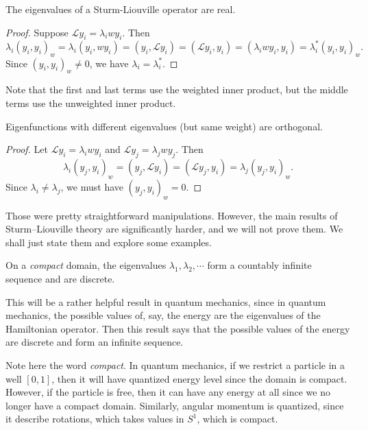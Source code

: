 \documentclass[a4paper]{article}
\begin{document}
\begin{prop}
  The eigenvalues of a Sturm-Liouville operator are real.
\end{prop}

\begin{proof}
  Suppose $\mathcal{L} y_i = \lambda_i w y_i$. Then
  \[
    \lambda_i (y_i, y_i)_w = \lambda_i (y_i, w y_i) = (y_i, \mathcal{L} y_i) = (\mathcal{L} y_i, y_i) = (\lambda_i w y_i, y_i) = \lambda_i^* (y_i, y_i)_w.
  \]
  Since $(y_i, y_i)_w \not= 0$, we have $\lambda_i = \lambda_i^*$.
\end{proof}
Note that the first and last terms use the weighted inner product, but the middle terms use the unweighted inner product.

\begin{prop}
  Eigenfunctions with different eigenvalues (but same weight) are orthogonal.
\end{prop}

\begin{proof}
  Let $\mathcal{L} y_i = \lambda_i w y_i$ and $\mathcal{L} y_j = \lambda_j w y_j$. Then
  \[
    \lambda_i (y_j, y_i)_w = (y_j, \mathcal{L} y_i) = (\mathcal{L} y_j, y_i) = \lambda_j (y_j, y_i)_w.
  \]
  Since $\lambda_i \not= \lambda_j$, we must have $(y_j, y_i)_w = 0$.
\end{proof}

Those were pretty straightforward manipulations. However, the main results of Sturm--Liouville theory are significantly harder, and we will not prove them. We shall just state them and explore some examples.
\begin{thm}
  On a \emph{compact} domain, the eigenvalues $\lambda_1, \lambda_2, \cdots$ form a countably infinite sequence and are discrete.
\end{thm}

This will be a rather helpful result in quantum mechanics, since in quantum mechanics, the possible values of, say, the energy are the eigenvalues of the Hamiltonian operator. Then this result says that the possible values of the energy are discrete and form an infinite sequence.

Note here the word \emph{compact}. In quantum mechanics, if we restrict a particle in a well $[0, 1]$, then it will have quantized energy level since the domain is compact. However, if the particle is free, then it can have any energy at all since we no longer have a compact domain. Similarly, angular momentum is quantized, since it describe rotations, which takes values in $S^1$, which is compact.
\end{document}
